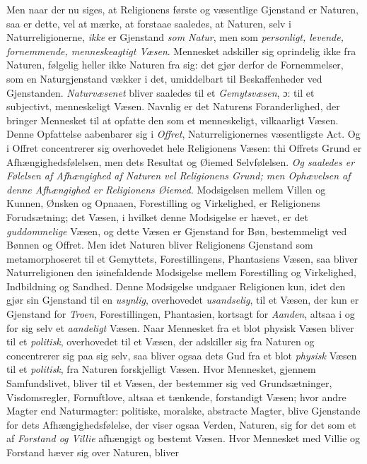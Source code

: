 Men naar der nu siges, at Religionens første og væsentlige Gjenstand er
Naturen, saa er dette, vel at mærke, at forstaae saaledes, at Naturen, selv i
Naturreligionerne, \emph{ikke} er Gjenstand \emph{som Natur}, men som \emph{personligt,
levende, fornemmende, menneskeagtigt Væsen}. Mennesket adskiller sig oprindelig
ikke fra Naturen, følgelig heller ikke Naturen fra sig: det gjør derfor de
Fornemmelser, som en Naturgjenstand vækker i det, umiddelbart til
Beskaffenheder ved Gjenstanden. \emph{Naturvæsenet} bliver saaledes til et
\emph{Gemytsvæsen}, ɔ: til et subjectivt, menneskeligt Væsen.
 Navnlig er det Naturens Foranderlighed, der bringer Mennesket til at opfatte
den som et menneskeligt, vilkaarligt Væsen. Denne Opfattelse aabenbarer sig i
\emph{Offret}, Naturreligionernes væsentligste Act. Og i Offret concentrerer sig
overhovedet hele Religionens Væsen: thi Offrets Grund er
Afhængighedsfølelsen, men dets Resultat og Øiemed Selvfølelsen. \emph{Og saaledes
er Følelsen af Afhængighed af Naturen vel Religionens Grund; men Ophævelsen af
denne Afhængighed er Religionens Øiemed.} Modsigelsen mellem Villen og Kunnen,
Ønsken og Opnaaen, Forestilling og Virkelighed, er Religionens Forudsætning;
det Væsen, i hvilket denne Modsigelse er hævet, er det \emph{guddommelige} Væsen,
og dette Væsen er Gjenstand for Bøn, bestemmeligt ved Bønnen og Offret. Men
idet Naturen bliver Religionens Gjenstand som metamorphoseret til et Gemyttets,
Forestillingens, Phantasiens Væsen, saa bliver Naturreligionen den iøinefaldende
Modsigelse mellem Forestilling og Virkelighed, Indbildning og Sandhed. Denne
Modsigelse undgaaer Religionen kun, idet den gjør sin Gjenstand til en
\emph{usynlig}, overhovedet \emph{usandselig}, til et Væsen, der kun er Gjenstand
for \emph{Troen}, Forestillingen, Phantasien, kortsagt for \emph{Aanden}, altsaa i og
for sig selv et \emph{aandeligt} Væsen. Naar Mennesket fra et blot physisk Væsen
bliver til et \emph{politisk}, overhovedet til et Væsen, der adskiller sig fra
Naturen og concentrerer sig paa sig selv, saa bliver ogsaa dets Gud fra et blot
\emph{physisk} Væsen til et \emph{politisk}, fra Naturen forskjelligt Væsen. Hvor
Mennesket, gjennem Samfundslivet, bliver til et Væsen, der bestemmer sig ved
Grundsætninger, Visdomsregler, Fornuftlove, altsaa et tænkende, forstandigt
Væsen; hvor andre Magter end Naturmagter: politiske, moralske, abstracte
Magter, blive Gjenstande for dets Afhængighedsfølelse, der viser ogsaa Verden,
Naturen, sig for det som et af \emph{Forstand og Villie} afhængigt og bestemt
Væsen. Hvor Mennesket med Villie og Forstand hæver sig over Naturen, bliver
